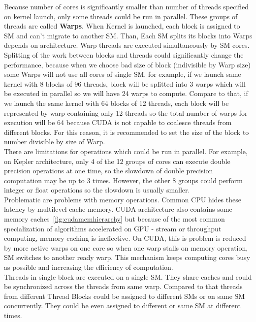 Because number of cores is significantly smaller than number of threads specified on kernel launch, only some threads could be run in parallel. These groups of threads are called \textbf{Warps}. When Kernel is launched, each block is assigned to SM and can't migrate to another SM. Than, Each SM splits its blocks into Warps depends on architecture. Warp threads are executed simultaneously by SM cores. Splitting of the work between blocks and threads could significantly change the performance, because when we choose bad size of block (indivisible by Warp size) some Warps will not use all cores of single SM. for example, if we launch same kernel with 8 blocks of 96 threads, block will be splitted into 3 warps which will be executed in parallel so we will have 24 warps to compute. Compare to that, if we launch the same kernel with 64 blocks of 12 threads, each block will be represented by warp containing only 12 threads so the total number of warps for execution will be 64 because CUDA is not capable to coalesce threads from different blocks. For this reason, it is recommended to set the size of the block to number divisible by size of Warp.\\
There are limitations for operations which could be run in parallel. For example, on Kepler architecture, only 4 of the 12 groups of cores can execute double precision operations at one time, so the slowdown of double precision computation may be up to 3 times. However, the other 8 groups could perform integer or float operations so the slowdown is usually smaller.\\
Problematic are problems with memory operations. Common CPU hides these latency by multilevel cache memory. CUDA architecture also contains some memory caches~\ref{fig:cudamemhierarchy} but because of the most common specialization of algorithms accelerated on GPU - stream or throughput computing, memory caching is ineffective. On CUDA, this is problem is reduced by more active warps on one core so when one warp stalls on memory operation, SM switches to another ready warp. This mechanism keeps computing cores busy as possible and increasing the efficiency of computation.\\
Threads in single block are executed on a single SM. They share caches and could be synchronized across the threads from same warp. Compared to that threads from different Thread Blocks could be assigned to different SMs or on same SM concurrently. They could be even assigned to different or same SM at different times.

